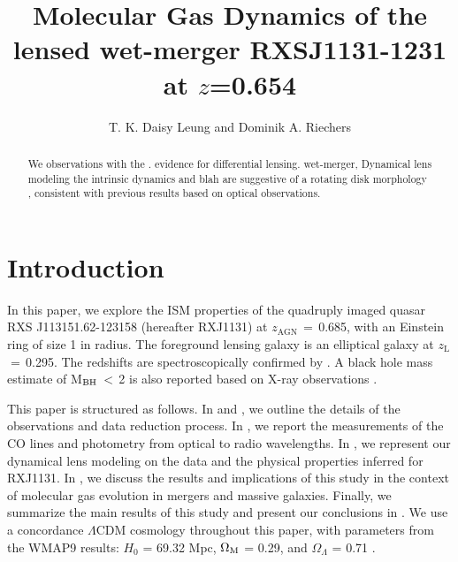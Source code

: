 \documentclass[]{emulateapj}
\begin{document}

\title{Molecular Gas Dynamics of the lensed wet-merger RXSJ1131-1231 at $z$=0.654}
\author{T. K. Daisy Leung and Dominik A. Riechers}


\begin{abstract}
We \bco observations with the \pdbi.
evidence for differential lensing.
wet-merger, Dynamical lens modeling
the intrinsic dynamics and blah are suggestive of a rotating disk morphology , consistent with previous results based on optical observations.
\end{abstract}


\section{Introduction}

In this paper, we explore the ISM properties of the quadruply imaged
quasar RXS J113151.62-123158 (hereafter RXJ1131) at
$z_\textrm{AGN}$\,$=$\,0.685, with an Einstein ring of size
1 in radius. The foreground lensing
galaxy is an elliptical galaxy at $z_\textrm{L}$\,$=$\,0.295. The redshifts
are spectroscopically confirmed by \citet{Sluse03a}.
A black hole mass estimate of M$_{\rm BH}$\,$<$\,2\Msun
is also reported based on X-ray observations \citep{Reis14a}.

This paper is structured as follows.
In  and , we outline the details of the observations and data reduction process.
In , we report the measurements of the CO lines and photometry from optical to radio wavelengths.
In , we represent our dynamical lens modeling on the \bco data and the physical properties inferred for  RXJ1131.
In , we discuss the results and implications of this study in the context of molecular gas evolution in mergers and massive galaxies.
Finally, we summarize the main results of this study and present our conclusions in .
We use a concordance $\Lambda$CDM cosmology throughout this paper, with
parameters from the WMAP9 results:
$H_0$ = 69.32 \kms Mpc\pmOne, $\Omega_{\rm M}$ = 0.29, and
$\Omega_{\Lambda}$ = 0.71 \citep{Hinshaw13a}.
\end{document}
